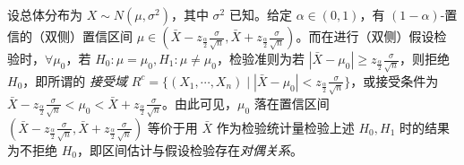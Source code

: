\documentclass[../main.tex]{subfiles}
\begin{document}
\begin{example}
设总体分布为 $X\sim N(\mu,\sigma^2)$，其中 $\sigma^2$ 已知。给定 $\alpha\in(0,1)$，有 $(1-\alpha)$-置信的（双侧）置信区间 $\mu\in(\bar X-z_{\frac\alpha 2}\frac\sigma{\sqrt n},\bar X+z_{\frac\alpha 2}\frac\sigma{\sqrt n})$。而在进行（双侧）假设检验时，$\forall\mu_0$，若 $H_0:\mu=\mu_0,H_1:\mu\neq\mu_0$，检验准则为若 $|\bar X-\mu_0|\geq z_{\frac\alpha 2}\frac\sigma{\sqrt n}$，则拒绝 $H_0$，即所谓的 \emph{接受域} $R^c=\{(X_1,\cdots,X_n)\mid|\bar X-\mu_0|<z_{\frac\alpha 2}\frac\sigma{\sqrt n}\}$，或接受条件为 $\bar X-z_{\frac\alpha 2}\frac\sigma{\sqrt n}<\mu_0<\bar X+z_{\frac\alpha 2}\frac\sigma{\sqrt n}$。由此可见，$\mu_0$ 落在置信区间 $(\bar X-z_{\frac\alpha 2}\frac\sigma{\sqrt n},\bar X+z_{\frac\alpha 2}\frac\sigma{\sqrt n})$ 等价于用 $\bar X$ 作为检验统计量检验上述 $H_0,H_1$ 时的结果为不拒绝 $H_0$，即区间估计与假设检验存在\emph{对偶关系}。
\end{example}
\end{document}
